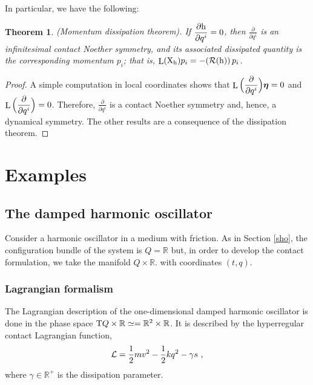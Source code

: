 \documentclass[12pt]{report}
\newtheorem{teor}{Theorem}[chapter]
\def\dst{\displaystyle}
\def\Lag{{\cal L}}
\def\Real{\mathbb{R}}
\def\bmeta{\mbox{\boldmath $\eta$}}
\def\X{{\rm X}}
\def\Tan{{\rm T}}
\def\Lie{\mathop{\rm L}\nolimits}
\newcommand{\Reeb}{\mathcal{R}}
\begin{document}
In particular, we have the following:

\begin{teor}{\rm (Momentum dissipation theorem).} 
If $\displaystyle\frac{\partial {\rm h}}{\partial q^i}=0$, 
then $\displaystyle\frac{\partial}{\partial q^i}$ 
is an infinitesimal contact Noether symmetry, 
and its associated dissipated quantity  
is the corresponding momentum $p_i$;
that is,
$\Lie(\X_{\rm h})p_i=-(\Reeb({\rm h}))\,p_i$.
\label{disipe3}
\end{teor}
\begin{proof}
A simple computation in local coordinates shows that 
$\displaystyle
\Lie\Big(\frac{\partial}{\partial q^i}\Big)\bmeta=0$ 
and 
$\displaystyle
\Lie\Big(\frac{\partial}{\partial q^i}\Big)=0$.
Therefore, $\dst\frac{\partial}{\partial q^i}$
is a contact Noether symmetry and, hence, a dynamical symmetry. 
The other results are a consequence of the dissipation theorem. 
\end{proof}



\section{Examples}


\subsection{The damped harmonic oscillator}


Consider a harmonic oscillator in a medium with friction.
As in Section \ref{sho},
the configuration bundle of the system is $Q=\Real$ but, in order to develop the contact formulation, we take the manifold $Q\times\Real$. with coordinates $(t,q)$.


\subsubsection{Lagrangian formalism}

The Lagrangian description of the one-dimensional damped harmonic oscillator is done in the phase space
$\Tan Q\times\Real\simeq=\Real^2\times\Real$.
It is described by the hyperregular contact Lagrangian function,
$$
\Lag=\frac{1}{2}mv^{2}-\frac{1}{2}kq^{2}-\gamma s \ ,
$$
where $\gamma\in\Real^+$ is the dissipation parameter.
\end{document}
